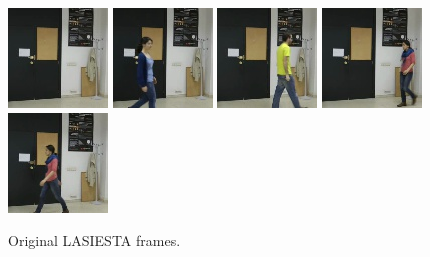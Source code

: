 \begin{subfigure}[t]{0.9\textwidth}
        \centering
        \includegraphics[scale=0.7]{figures/lasiesta/frame0}
        \hfill
        \includegraphics[scale=0.7]{figures/lasiesta/frame100}
        \hfill
        \includegraphics[scale=0.7]{figures/lasiesta/frame190}
        \hfill
        \includegraphics[scale=0.7]{figures/lasiesta/frame250}
        \hfill
        \includegraphics[scale=0.7]{figures/lasiesta/frame270}
        \caption{Original LASIESTA frames.}
    \end{subfigure}
    \\ \bigskip
